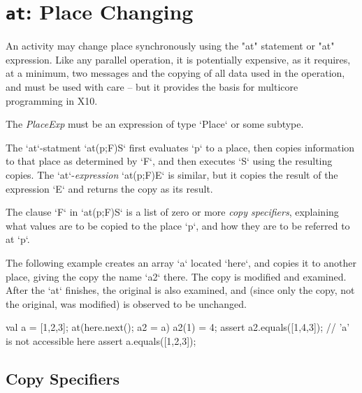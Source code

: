\section{ {\tt at}: Place Changing}\label{AtStatement}

An activity may change place synchronously using the \xcd"at" statement or
\xcd"at" expression. Like any parallel operation, it is 
potentially expensive, as it requires, at a minimum, two messages
and the copying of all data used in the operation, and must be used with care
-- but it provides the basis for multicore programming in X10.

\begin{bbgrammar}
\end{bbgrammar}

The {\it PlaceExp} must be an expression of type \xcd`Place` or some subtype.

The \xcd`at`-statment \xcd`at(p;F)S` first evaluates \xcd`p` to a place, then
copies information to that place as determined by \xcd`F`, and then executes
\xcd`S` using the resulting copies.  The \xcd`at`-{\em expression}
\xcd`at(p;F)E` is similar, but it copies the result of the expression \xcd`E`
and returns the copy as its result.

The clause \xcd`F` in \xcd`at(p;F)S` is a list of zero or more {\em copy
specifiers}, explaining what values are to be copied to the place \xcd`p`, and
how they are to be referred to at \xcd`p`.  

\begin{ex}
The following example creates an array \xcd`a` located \xcd`here`, and copies
it to another place, giving the copy the name \xcd`a2` there.  The copy is
modified and examined.  After the \xcd`at` finishes, the original is also
examined, and (since only the copy, not the original, was modified) is observed
to be unchanged. 
\begin{xten}
val a = [1,2,3];
at(here.next(); a2 = a) {
  a2(1) = 4;
  assert a2.equals([1,4,3]);
  // 'a' is not accessible here
}
assert a.equals([1,2,3]);
\end{xten}
\end{ex}

\subsection{Copy Specifiers}
\label{sect:copy-spec}

